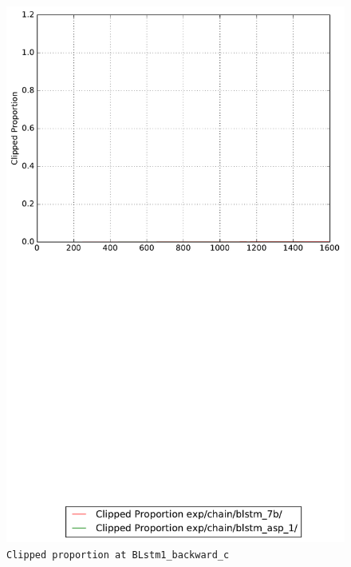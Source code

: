 \documentclass[prl,10pt,twocolumn]{revtex4}
\begin{document}
\newpage
\begin{figure}[h]
  \begin{center}
    \caption{\texttt{Clipped proportion at BLstm1\_backward\_c}}
    \includegraphics[width=\textwidth]{exp/chain/blstm_7b/report/clipped_proportion_BLstm1_backward_c.pdf}
  \end{center}
\end{figure}
\clearpage
\end{document}
